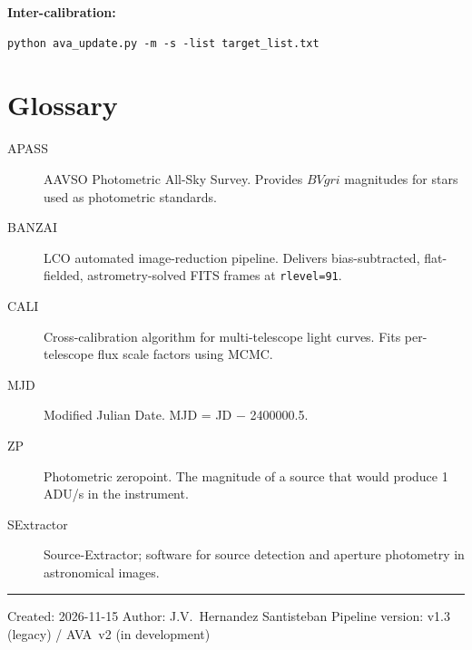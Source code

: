 \documentclass[12pt,a4paper]{article}
\begin{document}
\textbf{Inter-calibration:}
\begin{lstlisting}[style=shell]
python ava_update.py -m -s -list target_list.txt
\end{lstlisting}

\section{Glossary}
\label{app:glossary}

\begin{description}
  \item[APASS] AAVSO Photometric All-Sky Survey.  Provides $BVgri$ magnitudes for
        stars used as photometric standards.
  \item[BANZAI] LCO automated image-reduction pipeline.  Delivers bias-subtracted,
        flat-fielded, astrometry-solved FITS frames at \texttt{rlevel=91}.
  \item[CALI] Cross-calibration algorithm for multi-telescope light curves.  Fits
        per-telescope flux scale factors using MCMC.
  \item[MJD] Modified Julian Date. MJD = JD $-$ 2400000.5.
  \item[ZP] Photometric zeropoint.  The magnitude of a source that would produce
        1 ADU/s in the instrument.
  \item[SExtractor] Source-Extractor; software for source detection and aperture
        photometry in astronomical images.
\end{description}

\vfill
\hrule
\vspace{4pt}
{\small
Created: 2026-11-15 \quad
Author: J.V.\ Hernandez Santisteban \quad
Pipeline version: v1.3 (legacy) / AVA~v2 (in development)
}
\end{document}
